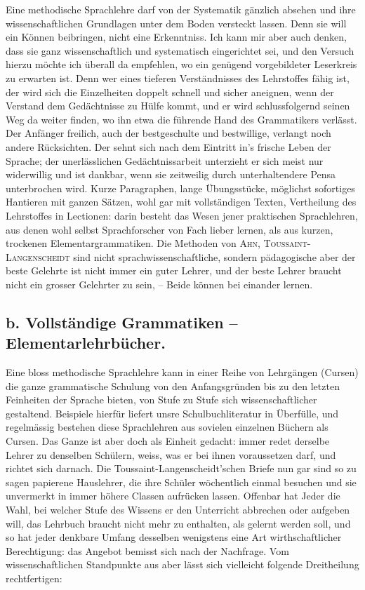 Eine methodische Sprachlehre darf von der Systematik gänzlich absehen und ihre wissenschaftlichen Grundlagen unter dem Boden versteckt lassen. Denn sie will ein Können beibringen, nicht eine Erkenntniss. Ich kann mir aber auch denken, dass sie ganz wissenschaftlich und systematisch eingerichtet sei, und den Versuch hierzu möchte ich überall da empfehlen, wo ein genügend vorgebildeter Leserkreis zu erwarten ist. Denn wer eines tieferen Verständnisses des Lehrstoffes fähig ist, der wird sich die Einzelheiten doppelt schnell und sicher aneignen, wenn der Verstand dem Gedächtnisse zu Hülfe kommt, und er wird schlussfolgernd seinen Weg da weiter finden, wo ihn etwa die führende Hand des Grammatikers verlässt. Der Anfänger freilich, auch der bestgeschulte und bestwillige, verlangt noch andere Rücksichten. Der sehnt sich nach dem Eintritt in’s frische Leben der Sprache; der unerlässlichen Gedächtnissarbeit unterzieht er sich meist nur widerwillig und ist dankbar, wenn sie zeitweilig durch unterhaltendere Pensa unterbrochen wird. Kurze Paragraphen, lange Übungsstücke, möglichst sofortiges Hantieren mit ganzen Sätzen, wohl gar mit vollständigen Texten, Ver\-theilung des Lehrstoffes in Lectionen: darin besteht das Wesen jener praktischen Sprachlehren, aus denen wohl selbst Sprachforscher von Fach lieber lernen, als aus kurzen, trockenen Elementargrammatiken. Die Methoden von \textsc{Ahn},  \textsc{Toussaint-Langenscheidt} sind nicht sprachwissenschaftliche, sondern pädagogische  aber der beste Gelehrte ist nicht immer ein guter Lehrer, und der beste Lehrer braucht nicht ein grosser Gelehrter zu sein, – Beide können bei einander lernen.

\label{fp.116}

\subsection*{b. Vollständige Grammatiken – Elementarlehrbücher.}
Eine bloss methodische Sprachlehre kann in einer Reihe von Lehrgängen (Cursen) die ganze grammatische Schulung von den Anfangsgründen bis zu den \label{sp.111} letzten Feinheiten der Sprache bieten, von Stufe zu Stufe sich wissenschaftlicher gestaltend. Beispiele hierfür liefert unsre Schulbuchliteratur in Überfülle, und regelmässig bestehen diese Sprachlehren aus sovielen einzelnen Büchern als Cursen. Das Ganze ist aber doch als Einheit gedacht: immer redet derselbe Lehrer zu denselben Schülern, weiss, was er bei ihnen voraussetzen darf, und richtet sich darnach. Die Toussaint-Langenscheidt’schen Briefe nun gar sind so zu sagen papierene Hauslehrer, die ihre Schüler wöchentlich einmal besuchen und sie unvermerkt in immer höhere Classen aufrücken lassen. Offenbar hat Jeder die Wahl, bei welcher Stufe des Wissens er den Unterricht abbrechen oder aufgeben will, das Lehrbuch braucht nicht mehr zu enthalten, als gelernt werden soll, und so hat jeder denkbare Umfang desselben wenigstens eine Art wirthschaftlicher Berechtigung: das Angebot bemisst sich nach der Nachfrage. Vom wissenschaftlichen Standpunkte aus aber lässt sich vielleicht folgende Dreitheilung rechtfertigen:

